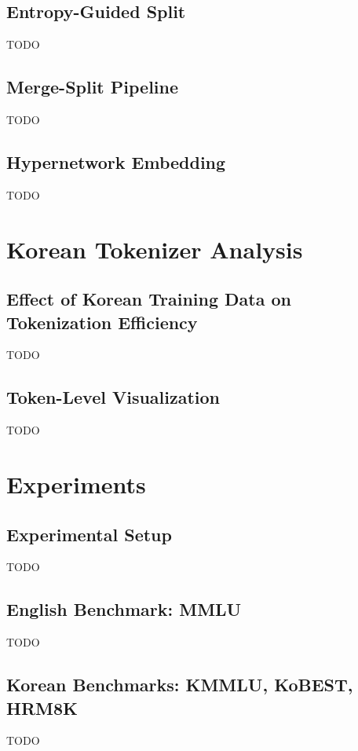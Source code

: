\documentclass{article} %
\begin{document}
\subsection{Entropy-Guided Split}
TODO

\subsection{Merge-Split Pipeline}
TODO

\subsection{Hypernetwork Embedding}
TODO

\section{Korean Tokenizer Analysis}
\label{sec:tokenizer}

\subsection{Effect of Korean Training Data on Tokenization Efficiency}
TODO

\subsection{Token-Level Visualization}
TODO

\section{Experiments}
\label{sec:experiments}

\subsection{Experimental Setup}
TODO

\subsection{English Benchmark: MMLU}
TODO

\subsection{Korean Benchmarks: KMMLU, KoBEST, HRM8K}
TODO
\end{document}
